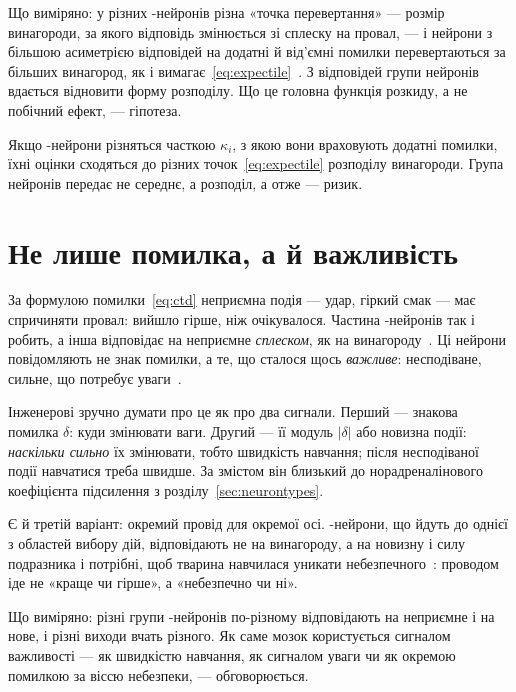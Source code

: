 Що виміряно: у різних -нейронів різна «точка перевертання» --- розмір винагороди, за якого відповідь змінюється зі сплеску на провал, --- і нейрони з більшою асиметрією відповідей на додатні й від'ємні помилки перевертаються за більших винагород, як і вимагає~\eqref{eq:expectile}~\cite{Dabney2020}. З відповідей групи нейронів вдається відновити форму розподілу. Що це головна функція розкиду, а не побічний ефект, --- гіпотеза.

\begin{keyblock}
\begin{proposition}
\label{prop:expectile}
Якщо -нейрони різняться часткою $\kappa_i$, з якою вони враховують додатні помилки, їхні оцінки сходяться до різних точок~\eqref{eq:expectile} розподілу винагороди. Група нейронів передає не середнє, а розподіл, а отже --- ризик.
\end{proposition}
\end{keyblock}

\section{Не лише помилка, а й важливість}

За формулою помилки~\eqref{eq:ctd} неприємна подія --- удар, гіркий смак --- має спричиняти провал: вийшло гірше, ніж очікувалося. Частина -нейронів так і робить, а інша відповідає на неприємне \emph{сплеском}, як на винагороду~\cite{Matsumoto2009}. Ці нейрони повідомляють не знак помилки, а те, що сталося щось \emph{важливе}: несподіване, сильне, що потребує уваги~\cite{BrombergMartin2010}.

Інженерові зручно думати про це як про два сигнали. Перший --- знакова помилка $\delta$: куди змінювати ваги. Другий --- її модуль $|\delta|$ або новизна події: \emph{наскільки сильно} їх змінювати, тобто швидкість навчання; після несподіваної події навчатися треба швидше. За змістом він близький до норадреналінового коефіцієнта підсилення з розділу~\ref{sec:neurontypes}.

Є й третій варіант: окремий провід для окремої осі. -нейрони, що йдуть до однієї з областей вибору дій, відповідають не на винагороду, а на новизну і силу подразника і потрібні, щоб тварина навчилася уникати небезпечного~\cite{Menegas2018}: проводом іде не «краще чи гірше», а «небезпечно чи ні».

Що виміряно: різні групи -нейронів по-різному відповідають на неприємне і на нове, і різні виходи вчать різного. Як саме мозок користується сигналом важливості --- як швидкістю навчання, як сигналом уваги чи як окремою помилкою за віссю небезпеки, --- обговорюється.


